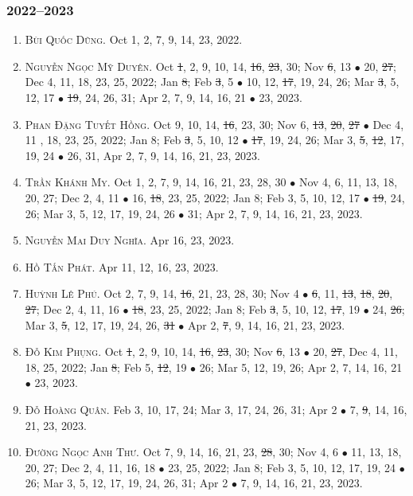 \documentclass{article}
\begin{document}
\subsubsection{2022--2023}

\begin{enumerate}
	\item \textsc{Bùi Quốc Dũng.} {\sf[In]} Oct 1, 2, 7, 9, 14, 23, 2022. {\sf[Out]}
	\item \textsc{Nguyễn Ngọc Mỹ Duyên.} {\sf[In]} Oct \st{1}, 2, 9, 10, 14, \st{16}, \st{23}, 30; Nov \st{6}, 13 $\bullet$ 20, \st{27}; Dec 4, 11, 18, 23, 25, 2022; Jan \st{8}; Feb \st{3}, 5 $\bullet$ 10, 12, \st{17}, 19, 24, 26; Mar \st{3}, 5, 12, 17 $\bullet$ \st{19}, 24, 26, 31; Apr 2, 7, 9, 14, 16, 21 $\bullet$ 23, 2023.
	\item \textsc{Phan Đặng Tuyết Hồng.} {\sf[In]} Oct 9, 10, 14, \st{16}, 23, 30; Nov 6, \st{13}, \st{20}, \st{27} $\bullet$ Dec 4, 11 , 18, 23, 25, 2022; Jan 8; Feb \st{3}, 5, 10, 12 $\bullet$ \st{17}, 19, 24, 26; Mar 3, \st{5}, \st{12}, 17, 19, 24 $\bullet$ 26, 31, Apr 2, 7, 9, 14, 16, 21, 23, 2023.
	\item \textsc{Trần Khánh My.} {\sf[In]} Oct 1, 2, 7, 9, 14, 16, 21, 23, 28, 30 $\bullet$ Nov 4, 6, 11, 13, 18, 20, 27; Dec 2, 4, 11 $\bullet$ 16, \st{18}, 23, 25, 2022; Jan 8; Feb 3, 5, 10, 12, 17 $\bullet$ \st{19}, 24, 26; Mar 3, 5, 12, 17, 19, 24, 26 $\bullet$ 31; Apr 2, 7, 9, 14, 16, 21, 23, 2023.
	\item \textsc{Nguyễn Mai Duy Nghĩa.} {\sf[In]} Apr 16, 23, 2023.
	\item \textsc{Hồ Tấn Phát.} {\sf[In]} Apr 11, 12, 16, 23, 2023.
	\item \textsc{Huỳnh Lê Phú.} {\sf[In]} Oct 2, 7, 9, 14, \st{16}, 21, 23, 28, 30; Nov 4 $\bullet$ \st{6}, 11, \st{13}, \st{18}, \st{20}, \st{27}; Dec 2, 4, 11, 16 $\bullet$ \st{18}, 23, 25, 2022; Jan 8; Feb \st{3}, 5, 10, 12, \st{17}, 19 $\bullet$ 24, \st{26}; Mar 3, \st{5}, 12, 17, 19, 24, 26, \st{31} $\bullet$ Apr 2, \st{7}, 9, 14, 16, 21, 23, 2023.
	\item \textsc{Đỗ Kim Phụng.} {\sf[In]} Oct \st{1}, 2, 9, 10, 14, \st{16}, \st{23}, 30; Nov \st{6}, 13 $\bullet$ 20, \st{27}, Dec 4, 11, 18, 25, 2022; Jan \st{8}; Feb 5, \st{12}, 19 $\bullet$ 26; Mar 5, 12, 19, 26; Apr 2, 7, 14, 16, 21 $\bullet$ 23, 2023.
	\item \textsc{Đỗ Hoàng Quân.} {\sf[In]} Feb 3, 10, 17, 24; Mar 3, 17, 24, 26, 31; Apr 2 $\bullet$ 7, \st{9}, 14, 16, 21, 23, 2023.
	\item \textsc{Đường Ngọc Anh Thư.} {\sf[In]} Oct 7, 9, 14, 16, 21, 23, \st{28}, 30; Nov 4, 6 $\bullet$ 11, 13, 18, 20, 27; Dec 2, 4, 11, 16, 18 $\bullet$ 23, 25, 2022; Jan 8; Feb 3, 5, 10, 12, 17, 19, 24 $\bullet$ 26; Mar 3, 5, 12, 17, 19, 24, 26, 31; Apr 2 $\bullet$ 7, 9, 14, 16, 21, 23, 2023.
\end{enumerate}
\end{document}
